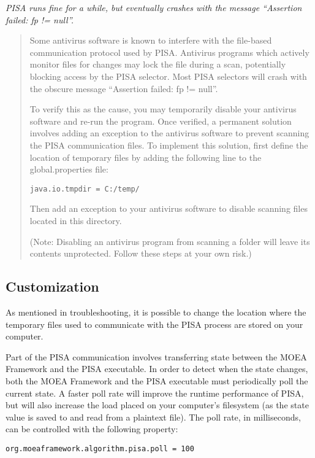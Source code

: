 \noindent
\textit{PISA runs fine for a while, but eventually crashes with the message ``Assertion failed: fp != null''.}

\begin{quote}
Some antivirus software is known to interfere with the file-based communication protocol used by PISA.  Antivirus programs which actively monitor files for changes may lock the file during a scan, potentially blocking access by the PISA selector.  Most PISA selectors will crash with the obscure message ``Assertion failed: fp != null''.

To verify this as the cause, you may temporarily disable your antivirus software and re-run the program.  Once verified, a permanent solution involves adding an exception to the antivirus software to prevent scanning the PISA communication files.  To implement this solution, first define the location of temporary files by adding the following line to the global.properties file:

\begin{lstlisting}[language=Plaintext]
java.io.tmpdir = C:/temp/
\end{lstlisting}

Then add an exception to your antivirus software to disable scanning files located in this directory.

(Note: Disabling an antivirus program from scanning a folder will leave its contents unprotected.  Follow these steps at your own risk.)
\end{quote}

\subsection{Customization}
As mentioned in troubleshooting, it is possible to change the location where the temporary files used to communicate with the PISA process are stored on your computer.

Part of the PISA communication involves transferring state between the MOEA Framework and the PISA executable.  In order to detect when the state changes, both the MOEA Framework and the PISA executable must periodically poll the current state.  A faster poll rate will improve the runtime performance of PISA, but will also increase the load placed on your computer's filesystem (as the state value is saved to and read from a plaintext file).  The poll rate, in milliseconds, can be controlled with the following property:

\begin{lstlisting}[language=Plaintext]
org.moeaframework.algorithm.pisa.poll = 100
\end{lstlisting}

